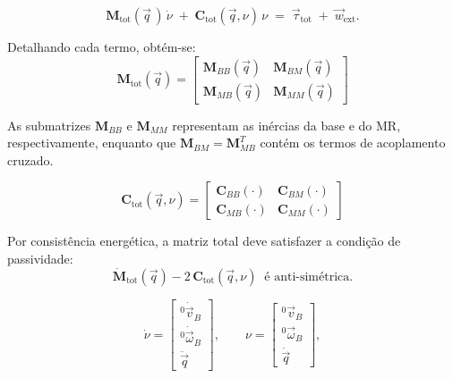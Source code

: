 \begin{equation}
\label{eq:EOM_particionada_compacta}
\mathbf M_{\text{tot}}(\vec q\, )\,\dot{\nu}
\;+\;
\mathbf C_{\text{tot}}(\vec q,\nu)\,\nu
\;=\;
\vec\tau_{\text{tot}}
\;+\;
\vec w_{\text{ext}}.
\end{equation}

Detalhando cada termo, obtém-se:
\begin{equation}
\label{eq:Mtot_def}
\mathbf M_{\text{tot}}(\vec q)
=
\begin{bmatrix}
\mathbf M_{BB}(\vec q) & \mathbf M_{BM}(\vec q) \\
\mathbf M_{MB}(\vec q) & \mathbf M_{MM}(\vec q)
\end{bmatrix}
\end{equation}

As submatrizes $\mathbf M_{BB}$ e $\mathbf M_{MM}$ representam as inércias da base e do MR, respectivamente, 
enquanto que $\mathbf M_{BM} = \mathbf M_{MB}^{T}$ contém os termos de acoplamento cruzado. 

\begin{equation}
\label{eq:Ctot_def}
\mathbf C_{\text{tot}}(\vec q,\nu)
=
\begin{bmatrix}
\mathbf C_{BB}(\cdot) & \mathbf C_{BM}(\cdot) \\
\mathbf C_{MB}(\cdot) & \mathbf C_{MM}(\cdot)
\end{bmatrix}
\end{equation}

Por consistência energética, a matriz total deve satisfazer a condição de passividade:
\begin{equation}
\dot{\mathbf M}_{\text{tot}}(\vec q) - 2\,\mathbf C_{\text{tot}}(\vec q,\nu) 
\;\;\text{é anti-simétrica}.
\end{equation}

\begin{equation}
\label{eq:stacked_defs1}
\dot{\nu} =
\begin{bmatrix}
{}^{0} \dot{\vec v}_{B} \\
{}^{0} \dot{\vec \omega}_{B} \\
\ddot{\vec q}
\end{bmatrix},
\qquad
\nu =
\begin{bmatrix}
{}^{0} \vec v_{B} \\
{}^{0} \vec \omega_{B} \\
\dot{\vec q}
\end{bmatrix},
\end{equation}

